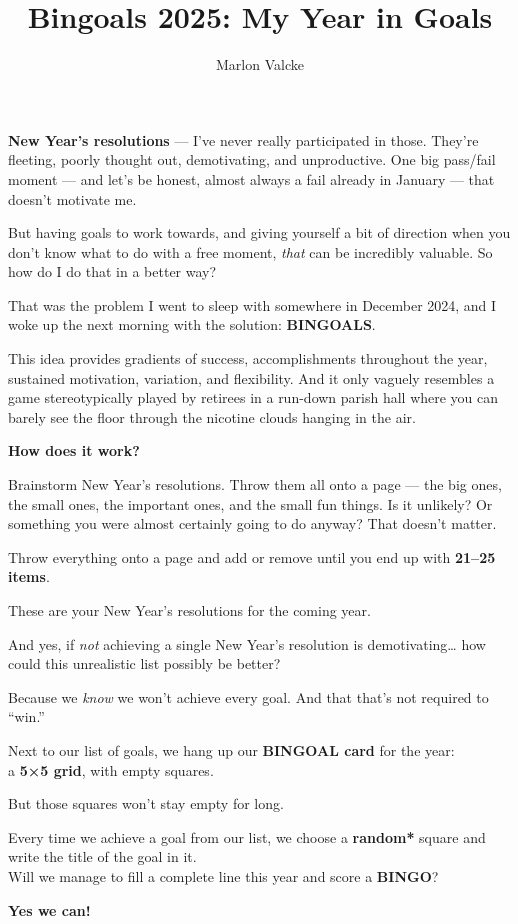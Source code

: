\documentclass[12pt]{article}
\title{Bingoals 2025: My Year in Goals}
\author{Marlon Valcke}
\date{}
\begin{document}
\textbf{New Year's resolutions} --- I've never really participated in
those. They're fleeting, poorly thought out, demotivating, and
unproductive. One big pass/fail moment --- and let's be honest, almost
always a fail already in January --- that doesn't motivate me.

But having goals to work towards, and giving yourself a bit of direction
when you don't know what to do with a free moment, \emph{that} can be
incredibly valuable. So how do I do that in a better way?

That was the problem I went to sleep with somewhere in December 2024,
and I woke up the next morning with the solution: \textbf{BINGOALS}.

This idea provides gradients of success, accomplishments throughout the
year, sustained motivation, variation, and flexibility. And it only
vaguely resembles a game stereotypically played by retirees in a
run-down parish hall where you can barely see the floor through the
nicotine clouds hanging in the air.

\textbf{How does it work?}

Brainstorm New Year's resolutions. Throw them all onto a page --- the
big ones, the small ones, the important ones, and the small fun things.
Is it unlikely? Or something you were almost certainly going to do
anyway? That doesn't matter.

Throw everything onto a page and add or remove until you end up with
\textbf{21--25 items}.

These are your New Year's resolutions for the coming year.

And yes, if \emph{not} achieving a single New Year's resolution is
demotivating\ldots{} how could this unrealistic list possibly be better?

Because we \emph{know} we won't achieve every goal. And that that's not
required to ``win.''

Next to our list of goals, we hang up our \textbf{BINGOAL card} for the
year:\\
a \textbf{5×5 grid}, with empty squares.

But those squares won't stay empty for long.

Every time we achieve a goal from our list, we choose a \textbf{random*}
square and write the title of the goal in it.\\
Will we manage to fill a complete line this year and score a
\textbf{BINGO}?

\textbf{Yes we can!}
\end{document}
